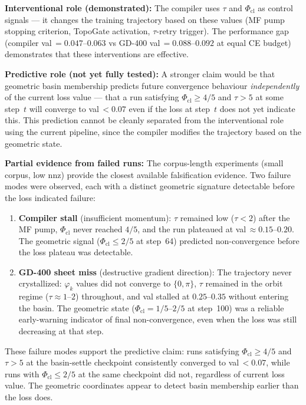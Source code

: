 \documentclass[11pt]{amsart}
\begin{document}
\textbf{Interventional role (demonstrated):}
The compiler uses $\tau$ and $\Phi_\mathrm{cl}$ as control signals ---
it changes the training trajectory based on these values
(MF pump stopping criterion, TopoGate activation, $\tau$-retry trigger).
The performance gap (compiler val\,$=0.047$--$0.063$ vs GD-400 val\,$=0.088$--$0.092$
at equal CE budget) demonstrates that these interventions are effective.

\textbf{Predictive role (not yet fully tested):}
A stronger claim would be that geometric basin membership predicts
future convergence behaviour \emph{independently} of the current loss value ---
that a run satisfying $\Phi_\mathrm{cl} \geq 4/5$ and $\tau > 5$ at some
step~$t$ will converge to val\,$< 0.07$ even if the loss at step~$t$ does
not yet indicate this.
This prediction cannot be cleanly separated from the interventional
role using the current pipeline, since the compiler modifies the
trajectory based on the geometric state.

\textbf{Partial evidence from failed runs:}
The corpus-length experiments (small corpus, low nnz) provide the
closest available falsification evidence.
Two failure modes were observed, each with a distinct geometric signature
detectable before the loss indicated failure:

\begin{enumerate}
\item \textbf{Compiler stall} (insufficient momentum):
  $\tau$ remained low ($\tau < 2$) after the MF pump,
  $\Phi_\mathrm{cl}$ never reached $4/5$,
  and the run plateaued at val\,$\approx 0.15$--$0.20$.
  The geometric signal ($\Phi_\mathrm{cl} \leq 2/5$ at step~64) predicted
  non-convergence before the loss plateau was detectable.

\item \textbf{GD-400 sheet miss} (destructive gradient direction):
  The trajectory never crystallized: $\varphi_k$ values did not
  converge to $\{0,\pi\}$, $\tau$ remained in the orbit regime ($\tau \approx 1$--$2$)
  throughout, and val stalled at $0.25$--$0.35$ without entering the basin.
  The geometric state ($\Phi_\mathrm{cl} = 1/5$--$2/5$ at step~100)
  was a reliable early-warning indicator of final non-convergence,
  even when the loss was still decreasing at that step.
\end{enumerate}

These failure modes support the predictive claim:
runs satisfying $\Phi_\mathrm{cl} \geq 4/5$ and $\tau > 5$ at the
basin-settle checkpoint consistently converged to val\,$< 0.07$,
while runs with $\Phi_\mathrm{cl} \leq 2/5$ at the same checkpoint
did not, regardless of current loss value.
The geometric coordinates appear to detect basin membership
earlier than the loss does.
\end{document}
